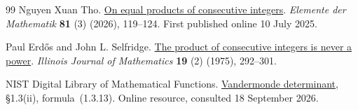 \documentclass[11pt]{article}
\begin{document}
\begin{thebibliography}{99}
{Nguyen Xuan Tho}. \href{https://doi.org/10.4171/EM/556}{On equal products of consecutive integers}.
\emph{Elemente der Mathematik} \textbf{81} (3) (2026), 119--124. First published online 10 July 2025.

Paul Erd{\H o}s and John L. Selfridge. \href{https://doi.org/10.1215/ijm/1256050816}{The product of consecutive integers is never a power}.
\emph{Illinois Journal of Mathematics} \textbf{19} (2) (1975), 292--301.

{NIST Digital Library of Mathematical Functions}.
\href{https://dlmf.nist.gov/1.3.E13}{Vandermonde determinant},
\S1.3(ii), formula~(1.3.13). Online resource, consulted 18 September 2026.

\end{thebibliography}
\end{document}
